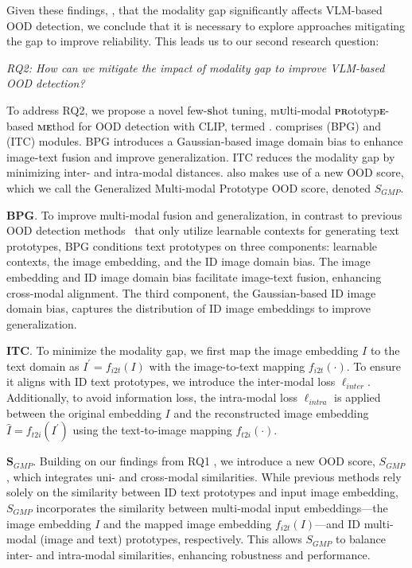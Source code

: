 Given these findings, \ie, that the modality gap significantly affects VLM-based OOD detection, we conclude that it is necessary to explore approaches mitigating the gap to improve reliability. 
This leads us to our second research question:
\begin{center} 
    \textit{RQ2: How can we mitigate the impact of modality gap to improve VLM-based OOD detection?} 
\end{center}
To address RQ2, we propose a novel few-\textbf{\textsc{s}}hot tuning, m\textbf{\textsc{u}}lti-modal \textbf{\textsc{pr}}ototyp\textbf{\textsc{e}}-based \textbf{\textsc{me}}thod for OOD detection with CLIP, termed \ours. 
\ours comprises \BPG (BPG) and \ITC (ITC) modules. 
BPG introduces a Gaussian-based image domain bias to enhance image-text fusion and improve generalization.
ITC reduces the modality gap by minimizing inter- and intra-modal distances. 
\ours also makes use of a new OOD score, which we call the Generalized Multi-modal Prototype OOD score, denoted $S_{\textit{GMP}}$. 

\noindent
\textbf{BPG}. 
To improve multi-modal fusion and generalization, in contrast to previous OOD detection methods~\cite{li_learning_2024,miyai_locoop_2023,bai_id-like_2024} that only utilize learnable contexts for generating text prototypes, BPG conditions text prototypes on three components: learnable contexts, the image embedding, and the ID image domain bias. 
The image embedding and ID image domain bias facilitate image-text fusion, enhancing cross-modal alignment. 
The third component, the Gaussian-based ID image domain bias, %
captures the distribution of ID image embeddings to improve generalization. 

\noindent
\textbf{ITC}. 
To minimize the modality gap, we first map the image embedding $I$ to the text domain as $I^{'} = f_{i2t}(I)$ with the image-to-text mapping $f_{i2t}(\cdot)$. 
To ensure it aligns with ID text prototypes, we introduce the inter-modal loss $\ell_{\textit{inter}}$. 
Additionally, to avoid information loss, the intra-modal loss $\ell_{\textit{intra}}$ is applied between the original embedding $I$ and the reconstructed image embedding $\hat{I}=f_{t2i}(I^{'})$ using the text-to-image mapping $f_{t2i}(\cdot)$. 

\noindent
$\pmb{S_{\textit{GMP}}}$. 
Building on our findings from RQ1%
, we introduce a new OOD score, %
$S_{\textit{GMP}}$, which integrates uni- and cross-modal similarities. 
While previous methods rely solely on the similarity between ID text prototypes and input image embedding, $S_{\textit{GMP}}$ incorporates the similarity between multi-modal input embeddings---the image embedding $I$ and the mapped image embedding $f_{i2t}(I)$---and ID multi-modal (image and text) prototypes, respectively. 
This allows $S_{\textit{GMP}}$ to balance inter- and intra-modal similarities, enhancing robustness and performance.


